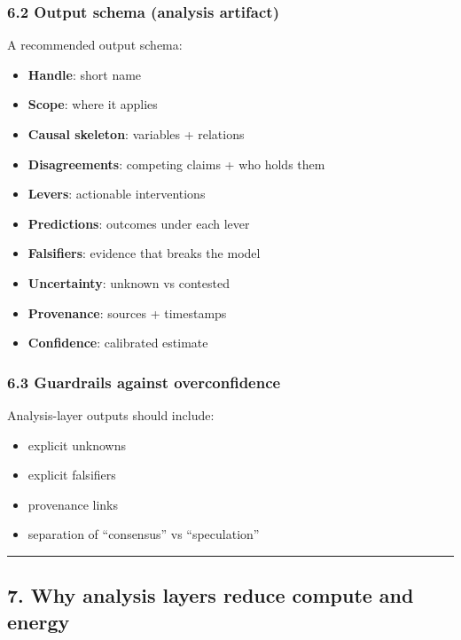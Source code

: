 \documentclass[11pt]{article}
\providecommand{\tightlist}{%
  \setlength{\itemsep}{0pt}\setlength{\parskip}{0pt}}
\begin{document}
\hypertarget{output-schema-analysis-artifact}{%
\subsubsection{6.2 Output schema (analysis
artifact)}\label{output-schema-analysis-artifact}}

A recommended output schema:

\begin{itemize}
\tightlist
\item
  \textbf{Handle}: short name
\item
  \textbf{Scope}: where it applies
\item
  \textbf{Causal skeleton}: variables + relations
\item
  \textbf{Disagreements}: competing claims + who holds them
\item
  \textbf{Levers}: actionable interventions
\item
  \textbf{Predictions}: outcomes under each lever
\item
  \textbf{Falsifiers}: evidence that breaks the model
\item
  \textbf{Uncertainty}: unknown vs contested
\item
  \textbf{Provenance}: sources + timestamps
\item
  \textbf{Confidence}: calibrated estimate
\end{itemize}

\hypertarget{guardrails-against-overconfidence}{%
\subsubsection{6.3 Guardrails against
overconfidence}\label{guardrails-against-overconfidence}}

Analysis-layer outputs should include:

\begin{itemize}
\tightlist
\item
  explicit unknowns
\item
  explicit falsifiers
\item
  provenance links
\item
  separation of ``consensus'' vs ``speculation''
\end{itemize}

\begin{center}\rule{0.5\linewidth}{0.5pt}\end{center}

\hypertarget{why-analysis-layers-reduce-compute-and-energy}{%
\subsection{7. Why analysis layers reduce compute and
energy}\label{why-analysis-layers-reduce-compute-and-energy}}
\end{document}
